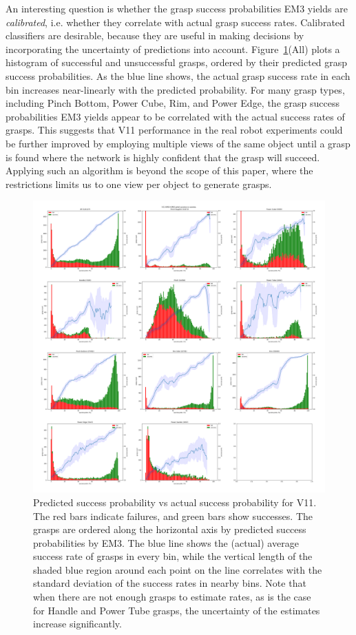An interesting question is whether the grasp success probabilities EM3 yields are \textit{calibrated}, i.e. whether they correlate with actual grasp success rates. Calibrated classifiers are desirable, because they are useful in making decisions by incorporating the uncertainty of predictions into account. Figure~\ref{fig:calibrate}(All) plots a histogram of successful and unsuccessful grasps, ordered by their predicted grasp success probabilities. As the blue line shows, the actual grasp success rate in each bin increases near-linearly with the predicted probability. For many grasp types, including Pinch Bottom, Power Cube, Rim, and Power Edge, the grasp success probabilities EM3 yields appear to be correlated with the actual success rates of grasps. This suggests that V11 performance in the real robot experiments could be further improved by employing multiple views of the same object until a grasp is found where the network is highly confident that the grasp will succeed. Applying such an algorithm is beyond the scope of this paper, where the restrictions limits us to one view per object to generate grasps.

\begin{figure}
\centering
\includegraphics[width=0.98\columnwidth]{images/post-analysis/V11_pred_success_vs_success.png}
\caption{Predicted success probability vs actual success probability for V11. The red bars indicate failures, and green bars show successes. The grasps are ordered along the horizontal axis by predicted success probabilities by EM3. The blue line shows the (actual) average success rate of grasps in every bin, while the vertical length of the shaded blue region around each point on the line correlates with the standard deviation of the success rates in nearby bins. Note that when there are not enough grasps to estimate rates, as is the case for Handle and Power Tube grasps, the uncertainty of the estimates increase significantly.}
\label{fig:calibrate}
\end{figure}

